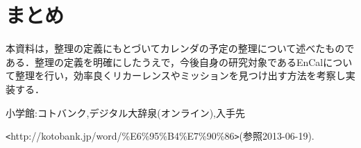 \documentclass[fleqn, 14pt]{extarticlej}
\begin{document}

\section{まとめ}
本資料は，整理の定義にもとづいてカレンダの予定の整理について述べたものである．整理の定義を明確にしたうえで，今後自身の研究対象であるEnCalについて整理を行い，効率良くリカーレンスやミッションを見つけ出す方法を考察し実装する．

\begin{thebibliography}{99}
   小学館:コトバンク,デジタル大辞泉(オンライン),入手先

\verb|<|http://kotobank.jp/word/\%E6\%95\%B4\%E7\%90\%86\verb|>|(参照2013-06-19).

\end{thebibliography}
\end{document}
